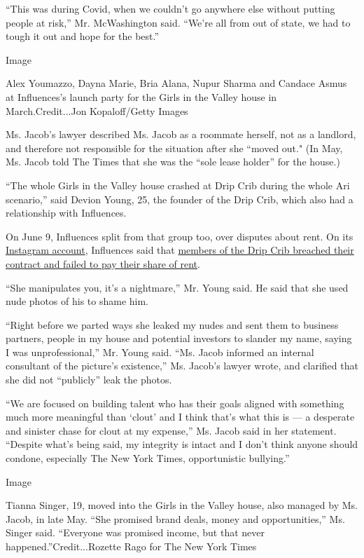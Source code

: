 ``This was during Covid, when we couldn't go anywhere else without
putting people at risk,'' Mr. McWashington said. ``We're all from out of
state, we had to tough it out and hope for the best.''

Image

Alex Youmazzo, Dayna Marie, Bria Alana, Nupur Sharma and Candace Asmus
at Influences's launch party for the Girls in the Valley house in
March.Credit...Jon Kopaloff/Getty Images

Ms. Jacob's lawyer described Ms. Jacob as a roommate herself, not as a
landlord, and therefore not responsible for the situation after she
``moved out." (In May, Ms. Jacob told The Times that she was the ``sole
lease holder'' for the house.)

``The whole Girls in the Valley house crashed at Drip Crib during the
whole Ari scenario,'' said Devion Young, 25, the founder of the Drip
Crib, which also had a relationship with Influences.

On June 9, Influences split from that group too, over disputes about
rent. On its
\href{https://twitter.com/TaylorLorenz/status/1270440685456560128}{Instagram
account}, Influences said that
\href{https://www.businessinsider.com/tiktok-influencer-group-drip-crib-facing-disputes-over-rent-manager-2020-6}{members
of the Drip Crib breached their contract and failed to pay their share
of rent}.

``She manipulates you, it's a nightmare,'' Mr. Young said. He said that
she used nude photos of his to shame him.

``Right before we parted ways she leaked my nudes and sent them to
business partners, people in my house and potential investors to slander
my name, saying I was unprofessional,'' Mr. Young said. ``Ms. Jacob
informed an internal consultant of the picture's existence,'' Ms.
Jacob's lawyer wrote, and clarified that she did not ``publicly'' leak
the photos.

``We are focused on building talent who has their goals aligned with
something much more meaningful than `clout' and I think that's what this
is --- a desperate and sinister chase for clout at my expense,'' Ms.
Jacob said in her statement. ``Despite what's being said, my integrity
is intact and I don't think anyone should condone, especially The New
York Times, opportunistic bullying.''

Image

Tianna Singer, 19, moved into the Girls in the Valley house, also
managed by Ms. Jacob, in late May. ``She promised brand deals, money and
opportunities,'' Ms. Singer said. ``Everyone was promised income, but
that never happened.''Credit...Rozette Rago for The New York Times

